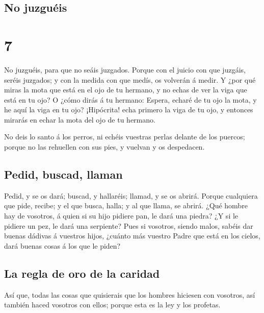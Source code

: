 \hypertarget{no-juzguuxe9is}{%
\subsection{No juzguéis}\label{no-juzguuxe9is}}

\hypertarget{section-6}{%
\section{7}\label{section-6}}

 No juzguéis, para que no seáis juzgados. 
Porque con el juicio con que juzgáis, seréis juzgados; y con la medida
con que medís, os volverán á medir.  Y ¿por qué miras la
mota que está en el ojo de tu hermano, y no echas de ver la viga que
está en tu ojo?  O ¿cómo dirás á tu hermano: Espera, echaré
de tu ojo la mota, y he aquí la viga en tu ojo?  ¡Hipócrita!
echa primero la viga de tu ojo, y entonces mirarás en echar la mota del
ojo de tu hermano.

 No deis lo santo á los perros, ni echéis vuestras perlas
delante de los puercos; porque no las rehuellen con sus pies, y vuelvan
y os despedacen.

\hypertarget{pedid-buscad-llaman}{%
\subsection{Pedid, buscad, llaman}\label{pedid-buscad-llaman}}

 Pedid, y se os dará; buscad, y hallaréis; llamad, y se os
abrirá.  Porque cualquiera que pide, recibe; y el que busca,
halla; y al que llama, se abrirá.  ¿Qué hombre hay de
vosotros, á quien si su hijo pidiere pan, le dará una piedra?
 ¿Y si le pidiere un pez, le dará una serpiente?
 Pues si vosotros, siendo malos, sabéis dar buenas dádivas
á vuestros hijos, ¿cuánto más vuestro Padre que está en los cielos, dará
buenas cosas á los que le piden?

\hypertarget{la-regla-de-oro-de-la-caridad}{%
\subsection{La regla de oro de la
caridad}\label{la-regla-de-oro-de-la-caridad}}

 Así que, todas las cosas que quisierais que los hombres
hiciesen con vosotros, así también haced vosotros con ellos; porque esta
es la ley y los profetas.

